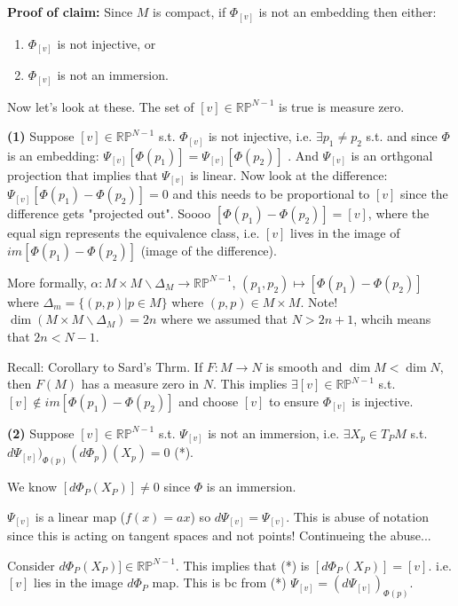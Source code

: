 \documentclass[12pt,letterpaper]{article}
\begin{document}
\textbf{Proof of claim: } Since $M$ is compact, if $\Phi_{[v]}$ is not an embedding then either:
\begin{enumerate}
    \item $\Phi_{[v]}$ is not injective, or \
    \item $\Phi_{[v]}$ is not an immersion.
\end{enumerate}
Now let's look at these. The set of $[v]\in \mathbb{R}\mathbb{P}^{N-1}$ is true is measure zero. 

\textbf{(1)} Suppose $[v] \in \mathbb{R}\mathbb{P}^{N-1}$ s.t. $\Phi_{[v]}$ is not injective, i.e. $\exists p_1 \neq p_2$ s.t. and since $\Phi$ is an embedding: $\Psi_{[v]}[\Phi(p_1)] = \Psi_{[v]} [\Phi(p_2)]$ .  And $\Psi_{[v]}$ is an orthgonal projection that implies that $\Psi_{[v]}$ is linear. Now look at the difference: $\Psi_{[v]} [\Phi(p_1) - \Phi(p_2)] = 0$ and this needs to be proportional to $[v]$ since the difference gets "projected out". Soooo $[\Phi(p_1) - \Phi(p_2)] = [v]$, where the equal sign represents the equivalence class, i.e. $[v]$ lives in the  image of $im[\Phi(p_1) - \Phi(p_2)]$ (image of the difference).

More formally, $\alpha: M \times M \backslash \Delta_M \rightarrow \mathbb{R}\mathbb{P}^{N-1}$, $(p_1, p_2) \mapsto [\Phi(p_1) - \Phi(p_2)]$ where $\Delta_m = \{ (p,p) | p \in M \}$ where $(p,p) \in M\times M$. Note! $\dim(M \times M \backslash \Delta_M)=2n$ where we assumed that $N > 2n+1$, whcih means that $2n < N-1$. 

Recall: Corollary to Sard's Thrm. If $F: M \rightarrow N$ is smooth and $\dim M < \dim N$, then $F(M)$ has a measure zero in $N$. This implies $\exists [v] \in \mathbb{R}\mathbb{P}^{N-1}$ s.t. $[v] \notin im[\Phi(p_1) - \Phi(p_2)]$ and choose $[v]$ to ensure $\Phi_{[v]}$ is injective. 

\textbf{(2)} Suppose $[v] \in \mathbb{R}\mathbb{P}^{N-1}$ s.t. $\Psi_{[v]}$ is not an immersion, i.e. $\exists X_p \in T_P M$ s.t. $d\Psi_{[v]})_{\Phi(p)} (d\Phi_p)(X_p) = 0$ (*). 

We know $[d\Phi_P(X_P)] \neq 0$ since $\Phi$ is an immersion. 

$\Psi_{[v]}$ is a linear map ($f(x) = ax$) so $d \Psi_{[v]} = \Psi_{[v]}$. This is abuse of notation since this is acting on tangent spaces and not points! Continueing the abuse...

Consider $d\Phi_P(X_P)] \in \mathbb{R}\mathbb{P}^{N-1}$. This implies that (*) is $[d\Phi_P(X_P)] = [v]$. i.e. $[v]$ lies in the image $d\Phi_P$ map. This is bc from (*) $\Psi_{[v]} = (d\Psi_{[v]})_{\Phi(p)}$.
\end{document}
